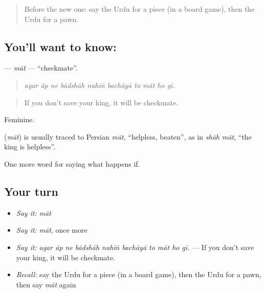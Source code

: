 \label{lesson:UR-C534-mat}



\begin{quote}
Before the new one: say the Urdu for a piece (in a board game), then the Urdu for a pawn.
\end{quote}

\subsection*{You'll want to know: }
\textbf{} — \emph{māt} — \textquotedblleft{}checkmate\textquotedblright{}.

\begin{quote}
         
\end{quote}

\begin{quote}
\emph{agar āp ne bādshāh nahīṅ bachāyā to māt ho gī.}
\end{quote}

\begin{quote}
If you don't save your king, it will be checkmate.
\end{quote}

Feminine.

\begin{cousinweb}
\textbf{} (\emph{māt}) is usually traced to Persian \emph{māt}, \textquotedblleft{}helpless, beaten\textquotedblright{}, as in \emph{shāh māt}, \textquotedblleft{}the king is helpless\textquotedblright{}.
\end{cousinweb}

\begin{grammarlens}[title={What you've built}]
One more word for saying what happens if.
\end{grammarlens}

\subsection*{Your turn}
\begin{itemize}
\raggedright
  \item \emph{Say it:} \emph{māt}
  \item \emph{Say it:} \emph{māt}, once more
  \item \emph{Say it:} \emph{agar āp ne bādshāh nahīṅ bachāyā to māt ho gī.} — If you don't save your king, it will be checkmate.
  \item \emph{Recall:} say the Urdu for a piece (in a board game), then the Urdu for a pawn, then say \emph{māt} again
\end{itemize}

